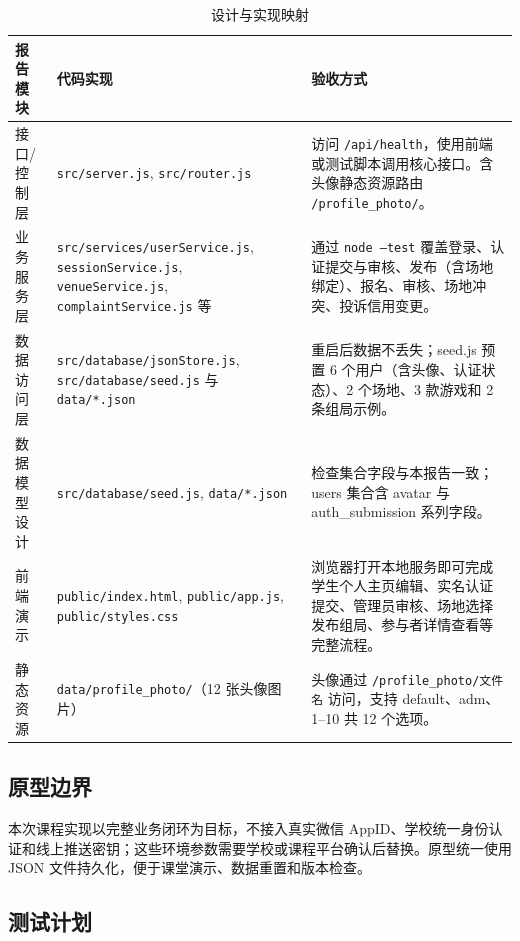 \documentclass[a4paper]{article}
\begin{document}
\begin{table}[H]
  \centering
  \begin{tabularx}{\linewidth}{P{3.0cm} P{5.4cm} Y}
    \toprule
    报告模块 & 代码实现 & 验收方式 \\
    \midrule
    接口/控制层 & \texttt{src/server.js}, \texttt{src/router.js} & 访问 \texttt{/api/health}，使用前端或测试脚本调用核心接口。含头像静态资源路由 \texttt{/profile\_photo/}。 \\
    业务服务层 & \texttt{src/services/userService.js}, \texttt{sessionService.js}, \texttt{venueService.js}, \texttt{complaintService.js} 等 & 通过 \texttt{node --test} 覆盖登录、认证提交与审核、发布（含场地绑定）、报名、审核、场地冲突、投诉信用变更。 \\
    数据访问层 & \texttt{src/database/jsonStore.js}, \texttt{src/database/seed.js} 与 \texttt{data/*.json} & 重启后数据不丢失；seed.js 预置 6 个用户（含头像、认证状态）、2 个场地、3 款游戏和 2 条组局示例。 \\
    数据模型设计 & \texttt{src/database/seed.js}, \texttt{data/*.json} & 检查集合字段与本报告一致；users 集合含 avatar 与 auth\_submission 系列字段。 \\
    前端演示 & \texttt{public/index.html}, \texttt{public/app.js}, \texttt{public/styles.css} & 浏览器打开本地服务即可完成学生个人主页编辑、实名认证提交、管理员审核、场地选择发布组局、参与者详情查看等完整流程。 \\
    静态资源 & \texttt{data/profile\_photo/}（12 张头像图片） & 头像通过 \texttt{/profile\_photo/文件名} 访问，支持 default、adm、1--10 共 12 个选项。 \\
    \bottomrule
  \end{tabularx}
  \caption{设计与实现映射}
\end{table}

\subsection{原型边界}

本次课程实现以完整业务闭环为目标，不接入真实微信 AppID、学校统一身份认证和线上推送密钥；这些环境参数需要学校或课程平台确认后替换。原型统一使用 JSON 文件持久化，便于课堂演示、数据重置和版本检查。

\subsection{测试计划}
\end{document}
